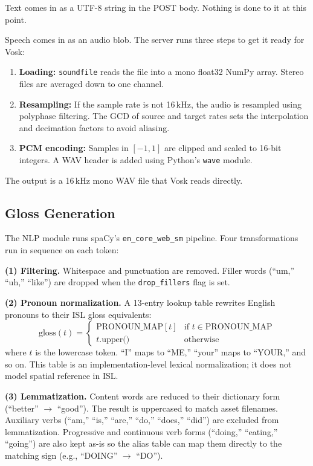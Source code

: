 \documentclass[conference]{IEEEtran}
\begin{document}
Text comes in as a UTF-8 string in the POST body. Nothing is done to it at this point.

Speech comes in as an audio blob. The server runs three steps to get it ready for Vosk:

\begin{enumerate}
    \item \textbf{Loading:} \texttt{soundfile} reads the file into a mono float32 NumPy array. Stereo files are averaged down to one channel.
    \item \textbf{Resampling:} If the sample rate is not 16\,kHz, the audio is resampled using polyphase filtering. The GCD of source and target rates sets the interpolation and decimation factors to avoid aliasing.
    \item \textbf{PCM encoding:} Samples in $[-1, 1]$ are clipped and scaled to 16-bit integers. A WAV header is added using Python's \texttt{wave} module.
\end{enumerate}

The output is a 16\,kHz mono WAV file that Vosk reads directly.

\subsection{Gloss Generation}

The NLP module runs spaCy's \texttt{en\_core\_web\_sm} pipeline. Four transformations run in sequence on each token:

\textbf{(1) Filtering.} Whitespace and punctuation are removed. Filler words (``um,'' ``uh,'' ``like'') are dropped when the \texttt{drop\_fillers} flag is set.

\textbf{(2) Pronoun normalization.} A 13-entry lookup table rewrites English pronouns to their ISL gloss equivalents:
\begin{equation}
\text{gloss}(t) =
\begin{cases}
\text{PRONOUN\_MAP}[t] & \text{if } t \in \text{PRONOUN\_MAP} \\
t.\text{upper()} & \text{otherwise}
\end{cases}
\label{eq:pronoun}
\end{equation}
where $t$ is the lowercase token. ``I'' maps to ``ME,'' ``your'' maps to ``YOUR,'' and so on. This table is an implementation-level lexical normalization; it does not model spatial reference in ISL.

\textbf{(3) Lemmatization.} Content words are reduced to their dictionary form (``better'' $\rightarrow$ ``good''). The result is uppercased to match asset filenames. Auxiliary verbs (``am,'' ``is,'' ``are,'' ``do,'' ``does,'' ``did'') are excluded from lemmatization. Progressive and continuous verb forms (``doing,'' ``eating,'' ``going'') are also kept as-is so the alias table can map them directly to the matching sign (e.g., ``DOING'' $\rightarrow$ ``DO'').
\end{document}
